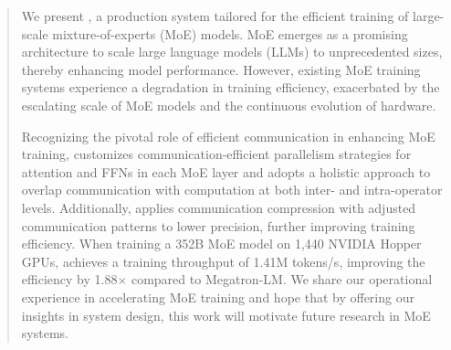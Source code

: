 \begin{abstract}

We present \sysname, a production system tailored for the efficient training of large-scale 
mixture-of-experts (MoE) models. MoE emerges as a promising architecture to scale large language 
models (LLMs) to unprecedented sizes, thereby enhancing model performance. However, existing MoE 
training systems experience a degradation in training efficiency, exacerbated by the escalating scale 
of MoE models and the continuous evolution of hardware. 
    
Recognizing the pivotal role of efficient communication in enhancing MoE training, \sysname customizes 
communication-efficient parallelism strategies for attention and FFNs in each MoE layer and adopts a 
holistic approach to overlap communication with computation at both inter- and intra-operator levels. 
Additionally, \sysname applies communication compression with adjusted communication patterns to lower 
precision, further improving training efficiency. When training a 352B MoE model on 1,440 NVIDIA Hopper 
GPUs, \sysname achieves a training throughput of 1.41M tokens/s, improving the efficiency by 
1.88$\times$ compared to Megatron-LM. We share our operational experience in accelerating MoE training 
and hope that by offering our insights in system design, this work will motivate future research in 
MoE systems.
    
\end{abstract}
